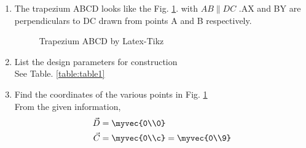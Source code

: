 \renewcommand{\theequation}{\theenumi}
\begin{enumerate}[label=\thesection.\arabic*.,ref=\thesection.\theenumi]

\item The trapezium ABCD looks like the Fig. \ref{fig:trapezium_ABCD}.
with $AB \parallel DC$ .AX and BY are perpendiculars to DC drawn from points A and B respectively.


\begin{figure}[!ht]
\centering
\resizebox{\columnwidth}{!}{}
\caption{Trapezium ABCD by Latex-Tikz}
\label{fig:trapezium_ABCD}	
\end{figure}
%


%
%
\item List the design parameters for construction
\label{const:table1}
\\
\solution See Table. \ref{table:table1} 
%
\begin{table}[ht!]
\centering

\caption{To construct trapezium ABCD}
\label{table:table1}	
\end{table}


\item Find the coordinates of the various points in Fig. \ref{fig:trapezium_ABCD}
\label{const:trapezium_ABCD}
\\
%
\solution From the given information, 
\begin{align}
\label{eq:constr_d}
\vec{D} &= \myvec{0\\0} 
\\
\vec{C} &= \myvec{0\\c} = \myvec{0\\9} 
\label{eq:constr_c}
\end{align}


\end{enumerate}
